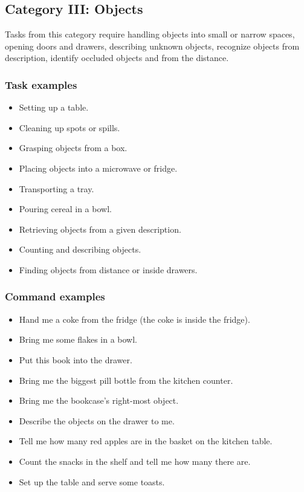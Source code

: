 %
%
\subsection{Category III: Objects}
\label{sec:eegpsr-category3-explained}
Tasks from this category require handling objects into small or narrow spaces, opening doors and drawers, describing unknown objects, recognize objects from description, identify occluded objects and from the distance.

\subsubsection{Task examples}
\begin{itemize}
	\item Setting up a table.
	\item Cleaning up spots or spills.
	\item Grasping objects from a box.
	\item Placing objects into a microwave or fridge.
	\item Transporting a tray.
	\item Pouring cereal in a bowl.
	\item Retrieving objects from a given description.
	\item Counting and describing objects.
	\item Finding objects from distance or inside drawers.
\end{itemize}

\subsubsection{Command examples}
\begin{itemize}
	\item Hand me a coke from the fridge (the coke is inside the fridge).
	\item Bring me some flakes in a bowl.
	\item Put this book into the drawer.
	\item Bring me the biggest pill bottle from the kitchen counter.
	\item Bring me the bookcase's right-most object.
	\item Describe the objects on the drawer to me.
	\item Tell me how many red apples are in the basket on the kitchen table.
	\item Count the snacks in the shelf and tell me how many there are.
	\item Set up the table and serve some toasts.
\end{itemize}




